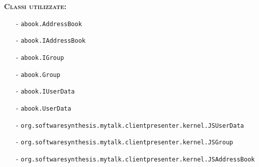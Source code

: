 \begin{description}
	\item{\scshape\bfseries Classi utilizzate:}\\
	\begin{itemize}[nolistsep, noitemsep]
	  \item[-] \texttt{abook.AddressBook}
	  \item[-] \texttt{abook.IAddressBook}
	  \item[-] \texttt{abook.IGroup}
	  \item[-] \texttt{abook.Group}
	  \item[-] \texttt{abook.IUserData}
	  \item[-] \texttt{abook.UserData}
	  \item[-] \texttt{org.softwaresynthesis.mytalk.clientpresenter.kernel.JSUserData}
	  \item[-] \texttt{org.softwaresynthesis.mytalk.clientpresenter.kernel.JSGroup}
	  \item[-] \texttt{org.softwaresynthesis.mytalk.clientpresenter.kernel.JSAddressBook}
	\end{itemize}
\end{description}

